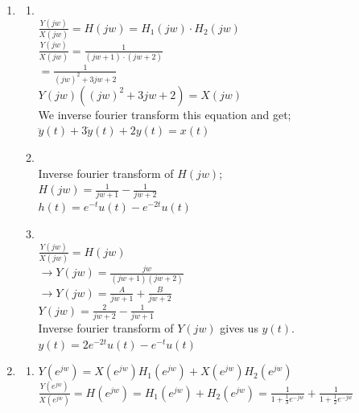 \documentclass[10pt,a4paper, margin=1in]{article}
\begin{document}
\begin{enumerate}
    \item %
          \begin{enumerate}
              \item~\\
              $\frac{Y(jw)}{X(jw)}=H(jw)=H_1(jw)\cdot H_2(jw)$\\
              $\frac{Y(jw)}{X(jw)} = \frac{1}{(jw+1)\cdot(jw+2)}$\\
              $=\frac{1}{(jw)^2+3jw+2}$\\
              $Y(jw)((jw)^2+3jw+2) = X(jw)$\\
              We inverse fourier transform this equation and get;\\
              $\ddot{y}(t)+3\dot{y}(t)+2y(t) = x(t)$\\
              \item~\\Inverse fourier transform of $H(jw)$;\\
              $H(jw) = \frac{1}{jw+1} - \frac{1}{jw+2}$\\
              $h(t) = e^{-t}u(t) -e^{-2t}u(t)$\\
              \item~\\ $\frac{Y(jw)}{X(jw)} = H(jw)$\\
              $\rightarrow Y(jw) = \frac{jw}{(jw+1)(jw+2)}$\\
              $\rightarrow Y(jw) = \frac{A}{jw+1} + \frac{B}{jw+2}$\\
              $Y(jw) = \frac{2}{jw+2} - \frac{1}{jw+1}$\\
              Inverse fourier transform of $Y(jw)$ gives us $y(t)$.\\
              $y(t) = 2e^{-2t}u(t)-e^{-t}u(t)$\\
          \end{enumerate}

    \item %
          \begin{enumerate}
              \item %
              $Y(e^{jw}) = X(e^{jw}) H_1(e^{jw}) + X(e^{jw}) H_2(e^{jw})$ \\

              $\frac{Y(e^{jw})}{X(e^{jw})} = H(e^{jw}) = H_1(e^{jw}) + H_2(e^{jw}) = \frac{1}{1 + \frac{1}{3}e^{-jw}} + \frac{1}{1 + \frac{1}{2}e^{-jw}}$ \\


\end{enumerate}
\end{enumerate}
\end{document}
